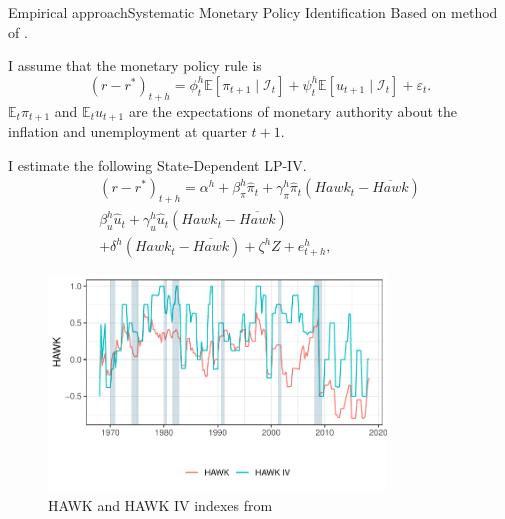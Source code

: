 \documentclass[11pt,pdf,aspectratio=129]{beamer}
\begin{document}
\begin{frame}{Empirical approach}{Systematic Monetary Policy Identification}
Based on method of \citet{HIM2023}.

I assume that the monetary policy rule is 
\[\left(r-r^*\right)_{t+h}=\phi_t^h\mathbb{E}\left[\pi_{t+1}\mid \mathcal{I}_t\right]+\psi_t^h\mathbb{E}\left[u_{t+1}\mid \mathcal{I}_t\right]+\varepsilon_t.\]
$\mathbb{E}_t\pi_{t+1}$ and $\mathbb{E}_t u_{t+1}$ are the expectations of monetary authority about the inflation and unemployment at quarter $t+1$.

I estimate the following State-Dependent LP-IV.
\begin{multline*}
    \left(r-r^*\right)_{t+h}=\alpha^h+\beta_\pi^h \hat\pi_t+\gamma_\pi^h \hat\pi_t\left(\mathit{Hawk}_{t}-\overline{\mathit{Hawk}}\right)\\ \beta_u^h \hat u_t+\gamma_u^h \hat u_t\left(\mathit{Hawk}_{t}-\overline{\mathit{Hawk}}\right)\\ +\delta^h\left(\mathit{Hawk}_{t}-\overline{\mathit{Hawk}}\right)+\zeta^hZ+e_{t+h}^h,
\end{multline*}
\end{frame}

\begin{frame}{}
    \begin{figure}[h!]
        \caption{HAWK and HAWK IV indexes from \citet{HIM2023}}
        \includegraphics[width=0.8\textwidth]{HAWK_plot.pdf}
    \end{figure}
\end{frame}
\end{document}
